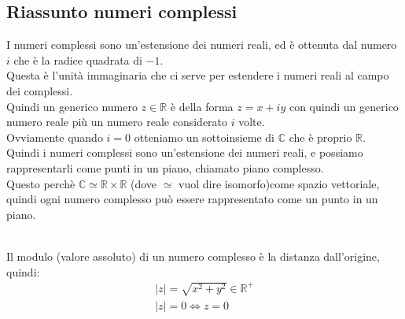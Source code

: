 \documentclass[a4paper, oneside]{article}
\begin{document}
\subsection{Riassunto numeri complessi}
I numeri complessi sono un'estensione dei numeri reali, ed è ottenuta dal numero $i$ che è la radice quadrata di $-1$.\\
Questa è l'unità immaginaria che ci serve per estendere i numeri reali al campo dei complessi.\\
Quindi un generico numero $z \in \mathbb{R}$ è della forma $z = x + iy$ con quindi un generico numero reale più un numero reale considerato $i$ volte.\\
Ovviamente quando $i = 0$ otteniamo un sottoinsieme di $\mathbb{C}$ che è proprio $\mathbb{R}$.\\
Quindi i numeri complessi sono un'estensione dei numeri reali, e possiamo rappresentarli come punti in un piano, chiamato piano complesso.\\
Questo perchè $\mathbb{C} \simeq \mathbb{R} \times \mathbb{R}$ (dove $\simeq$ vuol dire isomorfo)come spazio vettoriale, quindi ogni numero complesso può essere rappresentato come un punto in un piano.\\
\begin{center}
\end{center}
    \hfill\\
    \noindent
    Il modulo (valore assoluto) di un numero complesso è la distanza dall'origine, quindi:
    \begin{gather*}
        |z| = \sqrt{x^2 + y^2} \in \mathbb{R}^+\\
        |z| = 0 \Leftrightarrow z = 0
    \end{gather*}
\end{document}
